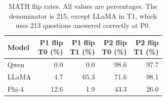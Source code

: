 \begin{table}[H]
\centering
\small
\caption{MATH flip rates. All values are percentages.
The denominator is 215, except LLaMA in T1, which uses
213 questions answered correctly at P0.}
\label{tab:math-flip-rates}

\begin{tabular}{@{}lrrrr@{}}
\toprule
Model
& \shortstack{P1 flip\\T0 (\%)}
& \shortstack{P1 flip\\T1 (\%)}
& \shortstack{P2 flip\\T0 (\%)}
& \shortstack{P2 flip\\T1 (\%)} \\
\midrule
Qwen  & 0.0  & 0.0  & 98.6 & 97.7 \\
LLaMA & 4.7  & 65.3 & 71.6 & 98.1 \\
Phi-4 & 12.6 & 1.9  & 43.3 & 26.0 \\
\bottomrule
\end{tabular}
\end{table}
